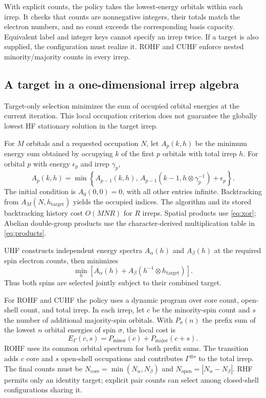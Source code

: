 \documentclass[aip,jcp,preprint,nobibnotes,nofootinbib]{revtex4-1}
\begin{document}
With explicit counts, the policy takes the lowest-energy orbitals within each
irrep. It checks that counts are nonnegative integers, their totals match the
electron numbers, and no count exceeds the corresponding basis capacity.
Equivalent label and integer keys cannot specify an irrep twice. If a target
is also supplied, the configuration must realize it. ROHF and CUHF enforce
nested minority/majority counts in every irrep.

\subsection{A target in a one-dimensional irrep algebra}

Target-only selection minimizes the sum of occupied orbital energies at the
current iteration. This local occupation criterion does not guarantee the
globally lowest HF stationary solution in the target irrep.

For $M$ orbitals and a requested occupation $N$, let $A_p(k,h)$ be the minimum
energy sum obtained by occupying $k$ of the first $p$ orbitals with total irrep
$h$. For orbital $p$ with energy $\epsilon_p$ and irrep $\gamma_p$,
\begin{equation}
 A_p(k,h)=\min\left\{
 A_{p-1}(k,h),\,
 A_{p-1}(k-1,h\otimes\gamma_p^{-1})+\epsilon_p
 \right\}.
 \label{eq:dp}
\end{equation}
The initial condition is $A_0(0,0)=0$, with all other entries infinite.
Backtracking from $A_M(N,h_{\mathrm{target}})$ yields the occupied indices.
The algorithm and its stored backtracking history cost $O(MNR)$ for $R$
irreps. Spatial products use \cref{eq:xor}; Abelian double-group products use
the character-derived multiplication table in \cref{eq:products}.

UHF constructs independent energy spectra $A_\alpha(h)$ and $A_\beta(h)$ at
the required spin electron counts, then minimizes
\begin{equation}
 \min_h\left[
 A_\alpha(h)+A_\beta(h^{-1}\otimes h_{\mathrm{target}})
 \right].
 \label{eq:uhf-selection}
\end{equation}
Thus both spins are selected jointly subject to their combined target.

For ROHF and CUHF the policy uses a dynamic program over core count, open-shell
count, and total irrep. In each irrep, let $c$ be the minority-spin count and
$s$ the number of additional majority-spin orbitals. With $P_\sigma(n)$ the
prefix sum of the lowest $n$ orbital energies of spin $\sigma$, the local cost
is
\begin{equation}
 E_\Gamma(c,s)=P_{\mathrm{minor}}(c)
              +P_{\mathrm{major}}(c+s).
 \label{eq:nested-cost}
\end{equation}
ROHF uses its common orbital spectrum for both prefix sums. The transition
adds $c$ core and $s$ open-shell occupations and contributes
$\Gamma^{\otimes s}$ to the total irrep. The final counts must be
$N_{\mathrm{core}}=\min(N_\alpha,N_\beta)$ and
$N_{\mathrm{open}}=|N_\alpha-N_\beta|$. RHF permits only an identity target;
explicit pair counts can select among closed-shell configurations sharing it.
\end{document}
